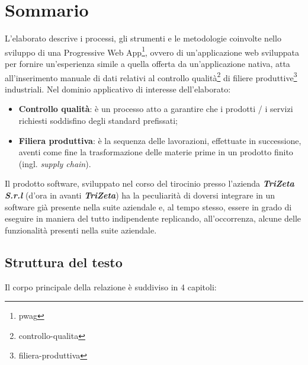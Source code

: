 \cleardoublepage
{}
{}
\begingroup
\let\clearpage\relax
\let\cleardoublepage\relax
\let\cleardoublepage\relax

\chapter*{Sommario}
L'elaborato descrive i processi, gli strumenti e le metodologie coinvolte nello sviluppo di una Progressive Web App\footnote{\gls{pwag}}, ovvero di un'applicazione web sviluppata per fornire un'esperienza simile a quella offerta da un'applicazione nativa, 
atta all'inserimento manuale di dati relativi al controllo qualità\footnote{\gls{controllo-qualita}} di 
filiere produttive\footnote{\gls{filiera-produttiva}} industriali. 
\newline
Nel dominio applicativo di interesse dell'elaborato:
\begin{itemize}
    \item \textbf{Controllo qualità}: è un processo atto a garantire che i prodotti / i servizi richiesti soddisfino degli standard prefissati;
    \item \textbf{Filiera produttiva}: è la sequenza delle lavorazioni, effettuate in successione, aventi come fine la trasformazione delle materie prime in un prodotto finito (ingl. \textit{supply chain}).
\end{itemize} 
Il prodotto software, sviluppato nel corso del tirocinio presso l'azienda \textit{\textbf{TriZeta S.r.l}} (d'ora in avanti \textit{\textbf{TriZeta}}) ha la peculiarità di doversi integrare in un software già presente nella suite aziendale e, al tempo stesso, essere in grado di eseguire in maniera del tutto indipendente replicando, all'occorrenza, alcune delle funzionalità presenti nella suite aziendale.

\section*{Struttura del testo}

Il corpo principale della relazione è suddiviso in 4 capitoli:

